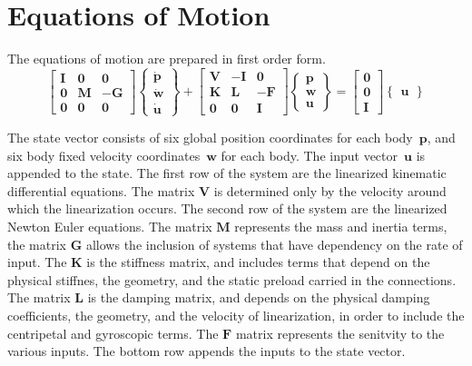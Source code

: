 \chapter{Equations of Motion}
The equations of motion are prepared in first order form.
\[
\begin{bmatrix}
{\mathbf I} & {\bm 0} & {\bm 0} \\ {\bm 0} & {\mathbf M} & -{\mathbf G} \\ {\bm 0} & {\bm 0} & {\bm 0}
\end{bmatrix}
\begin{Bmatrix}
\dot{\bm p}\\ \dot{\bm w} \\ \dot{\bm u}
\end{Bmatrix}
+\begin{bmatrix}
{\mathbf V} & -{\mathbf I} & {\bm 0} \\ {\mathbf K} & {\mathbf L} & -{\mathbf F} \\ {\bm 0} & {\bm 0} & {\mathbf I}
\end{bmatrix}
\begin{Bmatrix}
{\bm p}\\ {\bm w}\\ {\bm u}
\end{Bmatrix}
=\begin{bmatrix}
{\bm 0}\\ {\bm 0}\\ {\mathbf I}
\end{bmatrix}
\begin{Bmatrix}
{\bm u}
\end{Bmatrix}
\]

The state vector consists of six global position coordinates for each body~${\bm p}$, and six body fixed velocity coordinates~${\bm w}$ for each body.  The input vector~${\bm u}$ is appended to the state.  The first row of the system are the linearized kinematic differential equations.  The matrix ${\mathbf V}$ is determined only by the velocity around which the linearization occurs.  The second row of the system are the linearized Newton Euler equations.  The matrix ${\mathbf M}$ represents the mass and inertia terms, the matrix ${\mathbf G}$ allows the inclusion of systems that have dependency on the rate of input. The ${\mathbf K}$ is the stiffness matrix, and includes terms that depend on the physical stiffnes, the geometry, and the static preload carried in the connections.  The matrix ${\mathbf L}$ is the damping matrix, and depends on the physical damping coefficients, the geometry, and the velocity of linearization, in order to include the centripetal and gyroscopic terms.  The ${\mathbf F}$ matrix represents the senitvity to the various inputs.  The bottom row appends the inputs to the state vector.

